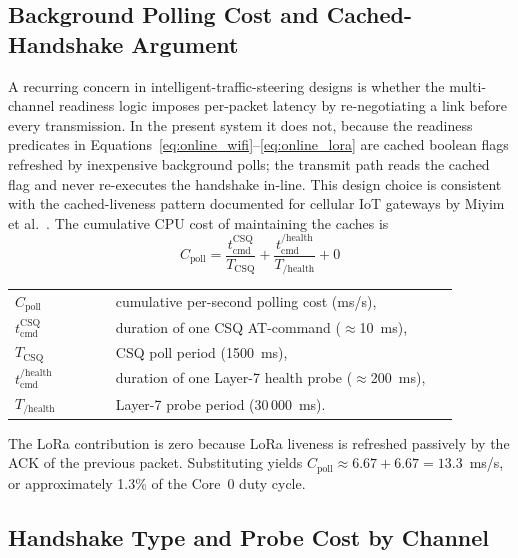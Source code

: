 \subsection{Background Polling Cost and Cached-Handshake Argument}
\label{sec:comm_polling_cost}

A recurring concern in intelligent-traffic-steering designs is whether the multi-channel readiness logic imposes per-packet latency by re-negotiating a link before every transmission. In the present system it does not, because the readiness predicates in Equations~\ref{eq:online_wifi}--\ref{eq:online_lora} are cached boolean flags refreshed by inexpensive background polls; the transmit path reads the cached flag and never re-executes the handshake in-line. This design choice is consistent with the cached-liveness pattern documented for cellular IoT gateways by Miyim et al.~\cite{miyim2019lte_performance}. The cumulative CPU cost of maintaining the caches is
\begin{equation}
C_{\mathrm{poll}} = \frac{t^{\mathrm{CSQ}}_{\mathrm{cmd}}}{T_{\mathrm{CSQ}}} + \frac{t^{/\mathrm{health}}_{\mathrm{cmd}}}{T_{/\mathrm{health}}} + 0
\label{eq:polling_cost}
\end{equation}
\noindent\begin{tabular}{@{}p{0.20\linewidth}@{\quad}p{0.68\linewidth}@{}}
$C_{\mathrm{poll}}$ & cumulative per-second polling cost (ms/s), \\
$t^{\mathrm{CSQ}}_{\mathrm{cmd}}$ & duration of one CSQ AT-command ($\approx$10~ms), \\
$T_{\mathrm{CSQ}}$ & CSQ poll period (1500~ms), \\
$t^{/\mathrm{health}}_{\mathrm{cmd}}$ & duration of one Layer-7 health probe ($\approx$200~ms), \\
$T_{/\mathrm{health}}$ & Layer-7 probe period (30\,000~ms).
\end{tabular}

\vspace{0.5em}
The LoRa contribution is zero because LoRa liveness is refreshed passively by the ACK of the previous packet. Substituting yields $C_{\mathrm{poll}} \approx 6.67 + 6.67 = 13.3$~ms/s, or approximately 1.3\% of the Core~0 duty cycle.

\subsection{Handshake Type and Probe Cost by Channel}
\label{sec:comm_handshake_probe}

